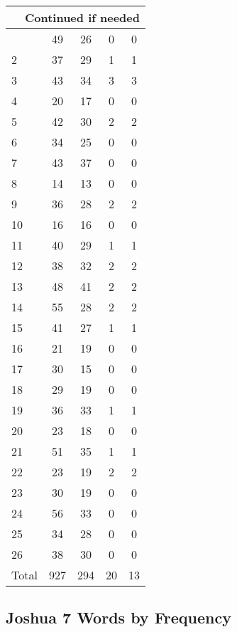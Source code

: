 \begin{center}
\begin{longtable}{l|c|c|c|c}
\hline \multicolumn{5}{|r|}{{Continued if needed}} \\ \hline
\endfoot 
1 & 49 & 26 & 0 & 0\\ \hline
2 & 37 & 29 & 1 & 1\\ \hline
3 & 43 & 34 & 3 & 3\\ \hline
4 & 20 & 17 & 0 & 0\\ \hline
5 & 42 & 30 & 2 & 2\\ \hline
6 & 34 & 25 & 0 & 0\\ \hline
7 & 43 & 37 & 0 & 0\\ \hline
8 & 14 & 13 & 0 & 0\\ \hline
9 & 36 & 28 & 2 & 2\\ \hline
10 & 16 & 16 & 0 & 0\\ \hline
11 & 40 & 29 & 1 & 1\\ \hline
12 & 38 & 32 & 2 & 2\\ \hline
13 & 48 & 41 & 2 & 2\\ \hline
14 & 55 & 28 & 2 & 2\\ \hline
15 & 41 & 27 & 1 & 1\\ \hline
16 & 21 & 19 & 0 & 0\\ \hline
17 & 30 & 15 & 0 & 0\\ \hline
18 & 29 & 19 & 0 & 0\\ \hline
19 & 36 & 33 & 1 & 1\\ \hline
20 & 23 & 18 & 0 & 0\\ \hline
21 & 51 & 35 & 1 & 1\\ \hline
22 & 23 & 19 & 2 & 2\\ \hline
23 & 30 & 19 & 0 & 0\\ \hline
24 & 56 & 33 & 0 & 0\\ \hline
25 & 34 & 28 & 0 & 0\\ \hline
26 & 38 & 30 & 0 & 0\\ \hline
Total & 927 & 294 & 20 & 13
\end{longtable}
\end{center}





\subsection{Joshua 7 Words by Frequency}


\normalsize
 
